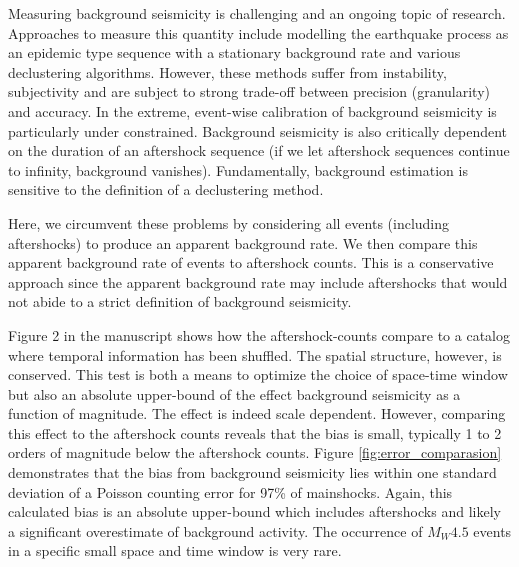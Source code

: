 \documentclass[draft]{agujournal}
\begin{document}
Measuring background seismicity is challenging and an ongoing topic of research. Approaches to measure this quantity include modelling the earthquake process as an epidemic type sequence with a stationary background rate and various declustering algorithms. However, these methods suffer from instability, subjectivity and are subject to strong trade-off between precision (granularity) and accuracy. In the extreme, event-wise calibration of background seismicity is particularly under constrained. Background seismicity is also critically dependent on the duration of an aftershock sequence (if we let aftershock sequences continue to infinity, background vanishes). Fundamentally, background estimation is sensitive to the definition of a declustering method. 

Here, we circumvent these problems by considering all events (including aftershocks) to produce an apparent background rate. We then compare this apparent background rate of events to aftershock counts. This is a conservative approach since the apparent background rate may include aftershocks that would not abide to a strict definition of background seismicity. 

Figure 2 in the manuscript shows how the aftershock-counts compare to a catalog where temporal information has been shuffled. The spatial structure, however, is conserved. This test is both a means to optimize the choice of space-time window but also an absolute upper-bound of the effect background seismicity as a function of magnitude. The effect is indeed scale dependent. However, comparing this effect to the  aftershock counts reveals that the bias is small, typically 1 to 2 orders of magnitude below the aftershock counts. Figure \ref{fig:error_comparasion} demonstrates that the bias from background seismicity lies within one standard deviation of a Poisson counting error for 97\% of mainshocks. Again, this calculated bias is an absolute upper-bound which includes aftershocks and likely a significant overestimate of background activity. The occurrence of $M_W4.5$ events in a specific small space and time window is very rare. 
\end{document}
